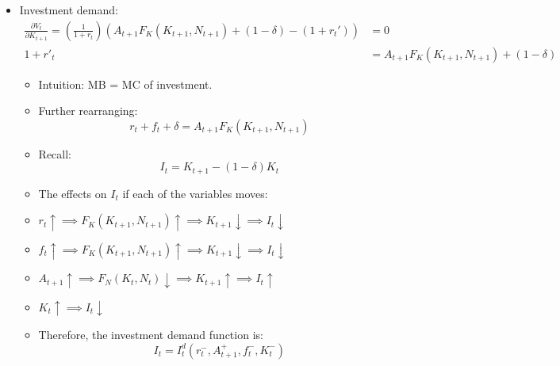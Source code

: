 \documentclass[notitlepage]{article}
\begin{document}
\begin{itemize}
\begin{itemize}
\begin{align*}
\frac{\partial V_t}{\partial N_t} = A_tF_N(K_t, N_t) - w_t &= 0 \\
w_t &= A_tF_N(K_t, N_t)
\end{align*}
\begin{itemize}
\item The effects on $N_t$ if each of the variables moves:
\item $w_t \uparrow \implies F_N(K_t, N_t) \uparrow \implies N_t \downarrow$
\item $A_t \uparrow \implies F_N(K_t, N_t) \downarrow \implies N_t \uparrow$
\item $K_t \uparrow, F_N(K_t, N_t) \sim \implies N_t \downarrow$
\item Therefore, the labor demand function (with symbols for relations) is:
\[
N_t = N^d_t(w_t^-, A_t^+, K_t^-)
\]
\end{itemize}

\item Investment demand:
\begin{align*}
\frac{\partial V_t}{\partial K_{t+1}} = \left(\frac{1}{1+r_t}\right) (A_{t+1}F_K(K_{t+1}, N_{t+1}) + (1-\delta) - (1+r_t')) &= 0 \\
1+r'_t &= A_{t+1}F_K(K_{t+1}, N_{t+1}) + (1-\delta)
\end{align*}
\begin{itemize}
\item Intuition: MB = MC of investment.
\item Further rearranging:
\[
r_t+f_t+\delta = A_{t+1}F_K(K_{t+1}, N_{t+1})
\]
\item Recall:
\[
I_t = K_{t+1} - (1-\delta)K_t 
\]
\item The effects on $I_t$ if each of the variables moves:
\item $r_t \uparrow \implies F_K(K_{t+1}, N_{t+1}) \uparrow \implies K_{t+1} \downarrow \implies I_t \downarrow$
\item $f_t \uparrow \implies F_K(K_{t+1}, N_{t+1}) \uparrow \implies K_{t+1} \downarrow \implies I_t \downarrow$
\item $A_{t+1} \uparrow \implies F_N(K_t, N_t) \downarrow \implies K_{t+1} \uparrow \implies I_t \uparrow$
\item $K_t \uparrow \implies I_t \downarrow$
\item Therefore, the investment demand function is:
\[
I_t = I^d_t(r_t^-, A_{t+1}^+, f_t^-, K_t^-)
\]
\end{itemize}
\end{itemize}
\end{itemize}
\end{document}
